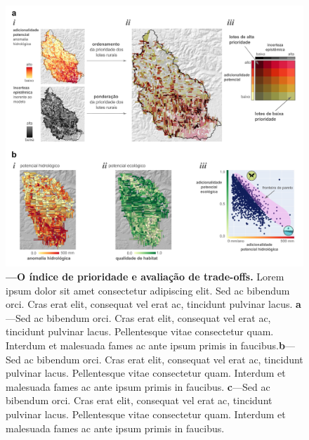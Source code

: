 \documentclass[./main.tex]{subfiles}
\begin{document}
\begin{figure}[t!] 
\centering				
\includegraphics[width=0.98\linewidth]{figs/fig_index.jpg}		
\caption[Lorem ipsum dolor sit amet]
{\textbf{---\;O índice de prioridade e avaliação de trade-offs.}
    Lorem ipsum dolor sit amet consectetur adipiscing elit. Sed ac bibendum orci. Cras erat elit, consequat vel erat ac, tincidunt pulvinar lacus. \;\textbf{a}\;---\;Sed ac bibendum orci. Cras erat elit, consequat vel erat ac, tincidunt pulvinar lacus. Pellentesque vitae consectetur quam. Interdum et malesuada fames ac ante ipsum primis in faucibus.\;\textbf{b}\;---\;Sed ac bibendum orci. Cras erat elit, consequat vel erat ac, tincidunt pulvinar lacus. Pellentesque vitae consectetur quam. Interdum et malesuada fames ac ante ipsum primis in faucibus. \;\textbf{c}\;---\;Sed ac bibendum orci. Cras erat elit, consequat vel erat ac, tincidunt pulvinar lacus. Pellentesque vitae consectetur quam. Interdum et malesuada fames ac ante ipsum primis in faucibus.
}
\label{fig:eco:addplans3} 		
\end{figure}
\end{document}
